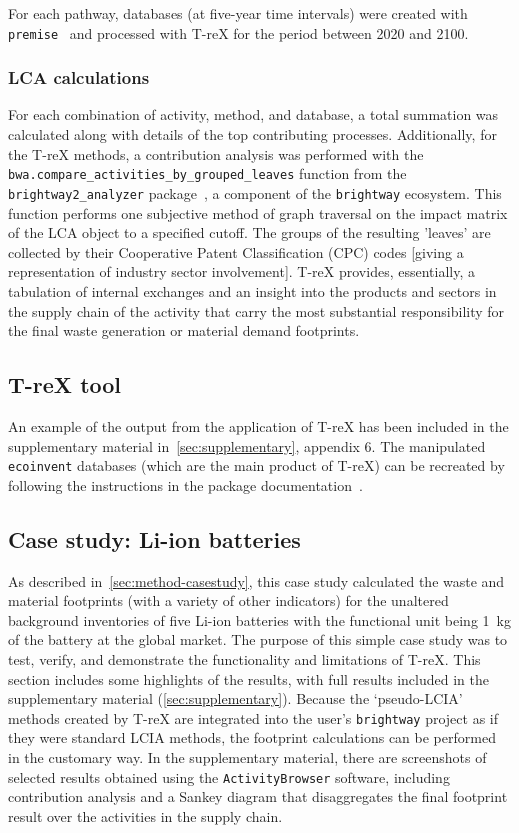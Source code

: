 \documentclass[a4paper,fleqn,longmktitle]{cas-dc}
\begin{document}
For each pathway, databases (at five-year time intervals) were created with \texttt{premise}~\citep{sacchi2022premise} and processed with T-reX for the period between 2020 and 2100.

\subsubsection{LCA calculations}
For each combination of activity, method, and database, a total summation was calculated along with details of the top contributing processes. Additionally, for the T-reX methods, a contribution analysis was performed with the \texttt{bwa.compare\_activities\_by\_grouped\_leaves} function from the \texttt{brightway2\_analyzer} package~\citep{mutel2016brightway2analyzer}, a component of the \texttt{brightway} ecosystem. This function performs one subjective method of graph traversal on the impact matrix of the LCA object to a specified cutoff. The groups of the resulting 'leaves' are collected by their Cooperative Patent Classification (CPC) codes [giving a representation of industry sector involvement]. T-reX provides, essentially, a tabulation of internal exchanges and an insight into the products and sectors in the supply chain of the activity that carry the most substantial responsibility for the final waste generation or material demand footprints.

\subsection{T-reX tool}\label{sec:results-T-reX}

An example of the output from the application of T-reX has been included in the supplementary material in~\autoref{sec:supplementary}, appendix 6. The manipulated \texttt{ecoinvent} databases (which are the main product of T-reX) can be recreated by following the instructions in the package documentation~\citep{mcdowall2023T-reXdocs}.

\subsection{Case study: Li-ion batteries}\label{sec:results-casestudy}

As described in~\autoref{sec:method-casestudy}, this case study calculated the waste and material footprints (with a variety of other indicators) for the unaltered background inventories of five Li-ion batteries with the functional unit being 1~kg of the battery at the global market. The purpose of this simple case study was to test, verify, and demonstrate the functionality and limitations of T-reX. This section includes some highlights of the results, with full results included in the supplementary material (\autoref{sec:supplementary}). Because the `pseudo-LCIA' methods created by T-reX are integrated into the user's \texttt{brightway} project as if they were standard LCIA methods, the footprint calculations can be performed in the customary way. In the supplementary material, there are screenshots of selected results obtained using the \texttt{ActivityBrowser} software, including contribution analysis and a Sankey diagram that disaggregates the final footprint result over the activities in the supply chain.
\end{document}
